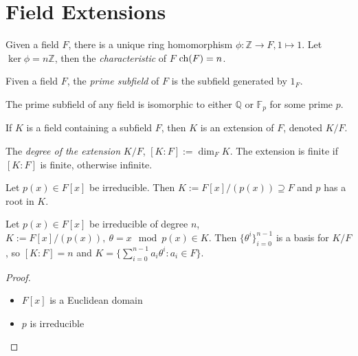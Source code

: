 \documentclass[a4paper]{article}
\begin{document}
\maketitle

\tableofcontents

\section{Field Extensions}

\begin{definition}
  Given a field $F$, there is a unique ring homomorphism $\phi: \mathbb{Z} \rightarrow F, 1 \mapsto 1$. Let $\ker \phi = n\mathbb{Z}$, then the \emph{characteristic} of $F$ $\operatorname{ch}(F) = n$.
\end{definition}

\begin{definition}
  Fiven a field $F$, the \emph{prime subfield} of $F$ is the subfield generated by $1_F$.
\end{definition}

The prime subfield of any field is isomorphic to either $\mathbb{Q}$ or $\mathbb{F}_p$ for some prime $p$.

\begin{definition}
  If $K$ is a field containing a subfield $F$, then $K$ is an extension of $F$, denoted $K/F$.
\end{definition}

\begin{definition}
  The \emph{degree of the extension} $K/F$, $[K:F] := \dim_FK$. The extension is finite if $[K:F]$ is finite, otherwise infinite.
\end{definition}

\begin{proposition}
  Let $p(x) \in F[x]$ be irreducible. Then $K:=F[x]/(p(x))\supseteq F$ and $p$ has a root in $K$.
\end{proposition}

\begin{proposition}
  Let $p(x) \in F[x]$ be irreducible of degree $n$, $K:=F[x]/(p(x)),\: \theta= x \mod{p(x)} \in K$. Then $\{\theta^i\}_{i=0}^{n-1}$ is a basis for $K/F$, so $[K:F]=n$ and $K=\{\sum_{i=0}^{n-1} a_i \theta^i:a_i \in F\}$.
\end{proposition}

\begin{proof}\leavevmode
  \begin{itemize}
  \item $F[x]$ is a Euclidean domain
  \item $p$ is irreducible
  \end{itemize}
\end{proof}
\end{document}
